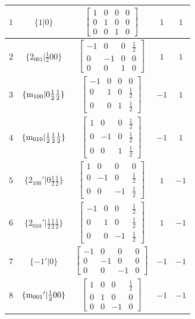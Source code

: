 \documentclass[fleqn,8pt]{jsarticle}
\begin{document}
\begin{longtable}{ccccc}
$ 1 $ & $ \{1|0\} $ & $ \begin{bmatrix} 1 & 0 & 0 & 0 \\ 0 & 1 & 0 & 0 \\ 0 & 0 & 1 & 0 \end{bmatrix} $ & $ 1 $ & $ 1 $ \\ \hline
$ 2 $ & $ \{2{}_{001}|\frac{1}{2} 0 0\} $ & $ \begin{bmatrix} -1 & 0 & 0 & \frac{1}{2} \\ 0 & -1 & 0 & 0 \\ 0 & 0 & 1 & 0 \end{bmatrix} $ & $ 1 $ & $ 1 $ \\ \hline
$ 3 $ & $ \{{\rm m}_{100}|0 \frac{1}{2} \frac{1}{2}\} $ & $ \begin{bmatrix} -1 & 0 & 0 & 0 \\ 0 & 1 & 0 & \frac{1}{2} \\ 0 & 0 & 1 & \frac{1}{2} \end{bmatrix} $ & $ -1 $ & $ 1 $ \\ \hline
$ 4 $ & $ \{{\rm m}_{010}|\frac{1}{2} \frac{1}{2} \frac{1}{2}\} $ & $ \begin{bmatrix} 1 & 0 & 0 & \frac{1}{2} \\ 0 & -1 & 0 & \frac{1}{2} \\ 0 & 0 & 1 & \frac{1}{2} \end{bmatrix} $ & $ -1 $ & $ 1 $ \\ \hline
$ 5 $ & $ \{2{}_{100}{}'|0 \frac{1}{2} \frac{1}{2}\} $ & $ \begin{bmatrix} 1 & 0 & 0 & 0 \\ 0 & -1 & 0 & \frac{1}{2} \\ 0 & 0 & -1 & \frac{1}{2} \end{bmatrix} $ & $ 1 $ & $ -1 $ \\ \hline
$ 6 $ & $ \{2{}_{010}{}'|\frac{1}{2} \frac{1}{2} \frac{1}{2}\} $ & $ \begin{bmatrix} -1 & 0 & 0 & \frac{1}{2} \\ 0 & 1 & 0 & \frac{1}{2} \\ 0 & 0 & -1 & \frac{1}{2} \end{bmatrix} $ & $ 1 $ & $ -1 $ \\ \hline
$ 7 $ & $ \{-1{}'|0\} $ & $ \begin{bmatrix} -1 & 0 & 0 & 0 \\ 0 & -1 & 0 & 0 \\ 0 & 0 & -1 & 0 \end{bmatrix} $ & $ -1 $ & $ -1 $ \\ \hline
$ 8 $ & $ \{{\rm m}_{001}{}'|\frac{1}{2} 0 0\} $ & $ \begin{bmatrix} 1 & 0 & 0 & \frac{1}{2} \\ 0 & 1 & 0 & 0 \\ 0 & 0 & -1 & 0 \end{bmatrix} $ & $ -1 $ & $ -1 $ \\
\end{longtable}
\end{document}
